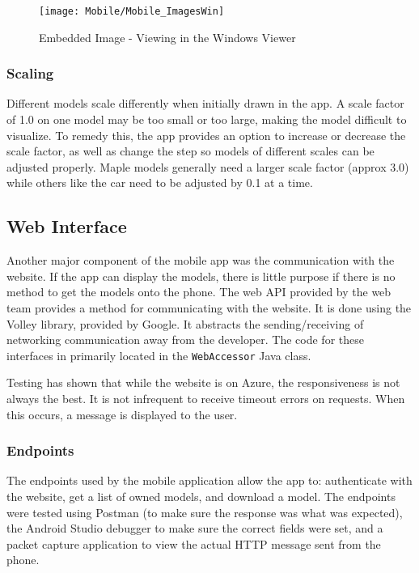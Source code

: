             \begin{figure}[H]
                \texttt{[image: Mobile/Mobile\_ImagesWin]}
                \centering
                \caption{Embedded Image - Viewing in the Windows Viewer}
                \label{fig:mobileEmbeddedWindows}
            \end{figure}

        \subsubsection{Scaling}

            Different models scale differently when initially drawn in the app. A scale factor of 1.0 on one model may be too small or too large, making the model difficult to visualize. To remedy this, the app provides an option to increase or decrease the scale factor, as well as change the step so models of different scales can be adjusted properly. Maple models generally need a larger scale factor (approx 3.0) while others like the car need to be adjusted by 0.1 at a time.
        
    \subsection{Web Interface}

        Another major component of the mobile app was the communication with the website.  If the app can display the models, there is little purpose if there is no method to get the models onto the phone.  The web API provided by the web team provides a method for communicating with the website.  It is done using the Volley library, provided by Google.  It abstracts the sending/receiving of networking communication away from the developer.  The code for these interfaces in primarily located in the \texttt{WebAccessor} Java class.

        Testing has shown that while the website is on Azure, the responsiveness is not always the best.  It is not infrequent to receive timeout errors on requests.  When this occurs, a message is displayed to the user.
        
        \subsubsection{Endpoints}
        
            The endpoints used by the mobile application allow the app to: authenticate with the website, get a list of owned models, and download a model.  The endpoints were tested using Postman (to make sure the response was what was expected), the Android Studio debugger to make sure the correct fields were set, and a packet capture application to view the actual HTTP message sent from the phone.


